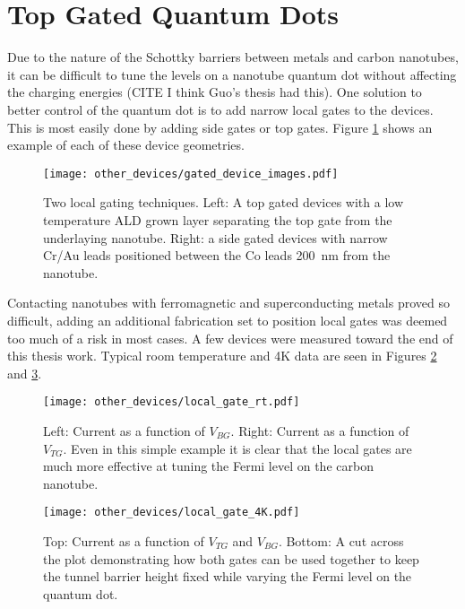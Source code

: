 \section{Top Gated Quantum Dots}

Due to the nature of the Schottky barriers between metals and carbon nanotubes, it can be difficult to tune the levels on a nanotube quantum dot without affecting the charging energies (CITE I think Guo's thesis had this). One solution to better control of the quantum dot is to add narrow local gates to the devices. This is most easily done by adding side gates or top gates. Figure \ref{fig:local_gating} shows an example of each of these device geometries.

\begin{figure}
    \centering
    \texttt{[image: other\_devices/gated\_device\_images.pdf]}
    \caption{Two local gating techniques. Left: A top gated devices with a low temperature ALD grown  layer separating the top gate from the underlaying nanotube. Right: a side gated devices with narrow Cr/Au leads positioned between the Co leads \SI{200}{\nano\meter} from the nanotube.}
    \label{fig:local_gating}
\end{figure}

Contacting nanotubes with ferromagnetic and superconducting metals proved so difficult, adding an additional fabrication set to position local gates was deemed too much of a risk in most cases. A few devices were measured toward the end of this thesis work. Typical room temperature and 4K data are seen in Figures \ref{fig:local_gate_rt} and \ref{fig:local_gate_4K}.

\begin{figure}
    \centering
    \texttt{[image: other\_devices/local\_gate\_rt.pdf]}
    \caption{Left: Current as a function of $V_{BG}$. Right: Current as a function of $V_{TG}$. Even in this simple example it is clear that the local gates are much more effective at tuning the Fermi level on the carbon nanotube.}
    \label{fig:local_gate_rt}
\end{figure}

\begin{figure}
    \centering
    \texttt{[image: other\_devices/local\_gate\_4K.pdf]}
    \caption{Top: Current as a function of $V_{TG}$ and $V_{BG}$. Bottom: A cut across the plot demonstrating how both gates can be used together to keep the tunnel barrier height fixed while varying the Fermi level on the quantum dot.}
    \label{fig:local_gate_4K}
\end{figure}

